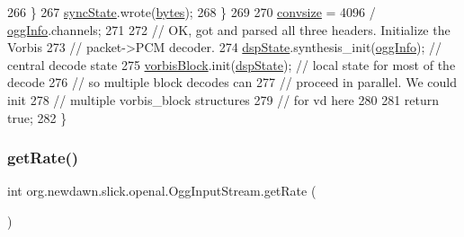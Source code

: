 \begin{DoxyCode}
266             \}
267             \mbox{\hyperlink{classorg_1_1newdawn_1_1slick_1_1openal_1_1_ogg_input_stream_a6cf0c439e1258dd57e8e83b52b76aefd}{syncState}}.wrote(\mbox{\hyperlink{classorg_1_1newdawn_1_1slick_1_1openal_1_1_ogg_input_stream_a00210211d97ece75ec471a2341e3d825}{bytes}});
268         \}
269 
270         \mbox{\hyperlink{classorg_1_1newdawn_1_1slick_1_1openal_1_1_ogg_input_stream_a4164d082fa5f390c0297501481e4db36}{convsize}} = 4096 / \mbox{\hyperlink{classorg_1_1newdawn_1_1slick_1_1openal_1_1_ogg_input_stream_a21aa37c5c0611a79132c4d76fbefe460}{oggInfo}}.channels;
271 
272         \textcolor{comment}{// OK, got and parsed all three headers. Initialize the Vorbis}
273         \textcolor{comment}{//  packet->PCM decoder.}
274         \mbox{\hyperlink{classorg_1_1newdawn_1_1slick_1_1openal_1_1_ogg_input_stream_aaa29998e4b4c69e6fba08f5ea5764d15}{dspState}}.synthesis\_init(\mbox{\hyperlink{classorg_1_1newdawn_1_1slick_1_1openal_1_1_ogg_input_stream_a21aa37c5c0611a79132c4d76fbefe460}{oggInfo}}); \textcolor{comment}{// central decode state}
275         \mbox{\hyperlink{classorg_1_1newdawn_1_1slick_1_1openal_1_1_ogg_input_stream_a1099572c535a994f564ec5ac35b656d9}{vorbisBlock}}.init(\mbox{\hyperlink{classorg_1_1newdawn_1_1slick_1_1openal_1_1_ogg_input_stream_aaa29998e4b4c69e6fba08f5ea5764d15}{dspState}}); \textcolor{comment}{// local state for most of the decode}
276         \textcolor{comment}{// so multiple block decodes can}
277         \textcolor{comment}{// proceed in parallel.  We could init}
278         \textcolor{comment}{// multiple vorbis\_block structures}
279         \textcolor{comment}{// for vd here}
280         
281         \textcolor{keywordflow}{return} \textcolor{keyword}{true};
282     \}
\end{DoxyCode}
\mbox{\label{classorg_1_1newdawn_1_1slick_1_1openal_1_1_ogg_input_stream_ae742f942523c3ec33053a494ee3f5050}} 
\subsubsection{\texorpdfstring{get\+Rate()}{getRate()}}
{\footnotesize\ttfamily int org.\+newdawn.\+slick.\+openal.\+Ogg\+Input\+Stream.\+get\+Rate (\begin{DoxyParamCaption}{ }\end{DoxyParamCaption})\hspace{0.3cm}{\ttfamily [inline]}}

